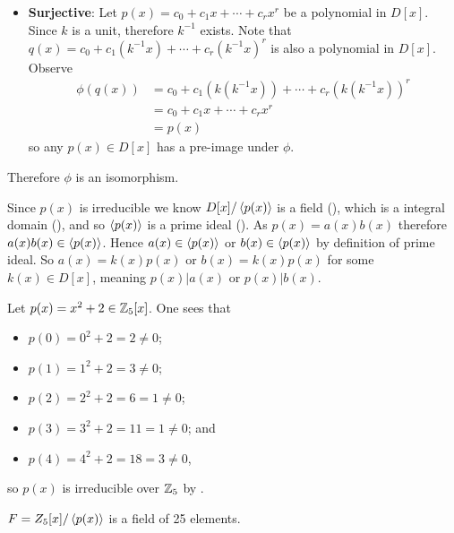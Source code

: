 \begin{questions}
\begin{itemize}
        \item \textbf{Surjective}: Let $p(x) = c_0 + c_1x + \cdots + c_rx^r$ be a polynomial in $D[x]$. Since $k$ is a unit, therefore $k^{-1}$ exists. Note that $q(x) = c_0 + c_1(k^{-1}x) + \cdots + c_r(k^{-1}x)^r$ is also a polynomial in $D[x]$. Observe
        \begin{align*}
            \phi(q(x)) &= c_0 + c_1(k(k^{-1}x)) + \cdots + c_r(k(k^{-1}x))^r\\
            &= c_0 + c_1x + \cdots + c_rx^r\\
            &= p(x)
        \end{align*}
        so any $p(x) \in D[x]$ has a pre-image under $\phi$.
    \end{itemize}
    Therefore $\phi$ is an isomorphism.

    \item Since $p(x)$ is irreducible we know $D[x]/\left\langle p(x)\right\rangle$ is a field (), which is a integral domain (), and so $\left\langle p(x)\right\rangle$ is a prime ideal (). As $p(x) = a(x)b(x)$ therefore $a(x)b(x) \in \left\langle p(x)\right\rangle$. Hence $a(x) \in \left\langle p(x)\right\rangle$ or $b(x) \in \left\langle p(x)\right\rangle$ by definition of prime ideal. So $a(x) = k(x)p(x)$ or $b(x) = k(x)p(x)$ for some $k(x) \in D[x]$, meaning $p(x) \vert a(x)$ or $p(x) \vert b(x)$.

    \item \begin{partquestions}{\roman*}
        \item Let $p(x) = x^2 + 2 \in \mathbb{Z}_5[x]$. One sees that
        \begin{itemize}
            \item $p(0) = 0^2 + 2 = 2 \neq 0$;
            \item $p(1) = 1^2 + 2 = 3 \neq 0$;
            \item $p(2) = 2^2 + 2 = 6 = 1 \neq 0$;
            \item $p(3) = 3^2 + 2 = 11 = 1 \neq 0$; and
            \item $p(4) = 4^2 + 2 = 18 = 3 \neq 0$,
        \end{itemize}
        so $p(x)$ is irreducible over $\mathbb{Z}_5$ by .

        \item $F = Z_5[x]/\left\langle p(x)\right\rangle$ is a field of 25 elements.


\end{partquestions}
\end{questions}
